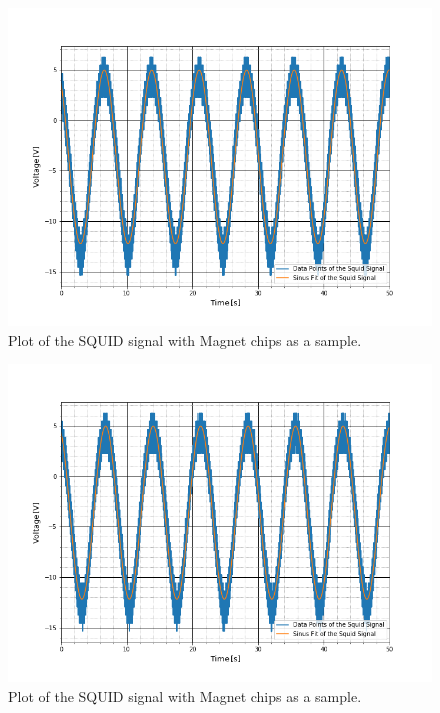 \begin{figure}[ht]
	\includegraphics[scale=0.5]{Bild/P3_3}
	\centering
	\caption[SQUID signal of Magnet Chips 3]{Plot of the SQUID signal with Magnet chips as a sample.}
\end{figure}
\begin{figure}[ht]
	\includegraphics[scale=0.5]{Bild/P3_4}
	\centering
	\caption[SQUID signal of Magnet Chips 4]{Plot of the SQUID signal with Magnet chips as a sample.}
\end{figure}
